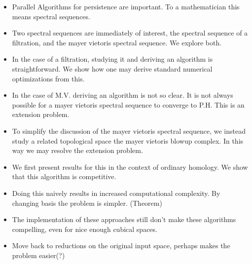 \begin{itemize}
\item Parallel Algorithms for persistence are important. To a mathematician this means spectral sequences.
\item Two spectral sequences are immediately of interest, the spectral sequence of a filtration, and the mayer vietoris spectral sequence.  We explore both.
\item In the case of a filtration, studying it and deriving an algorithm is straightforward. We show how one may derive standard numerical optimizations from this.
\item In the case of M.V. deriving an algorithm is not so clear. It is not always possible for a mayer vietoris spectral sequence to converge to P.H. This is an extension problem.
\item To simplify the discussion of the mayer vietoris spectral sequence, we instead study a related topological space the mayer vietoris blowup complex. In this way we may resolve the extension problem. 
\item We first present results for this in the context of ordinary homology. We show that this algorithm is competitive. 
\item Doing this naively results in increased computational complexity. By changing basis the problem is simpler. (Theorem)
\item The implementation of these approaches still don't make these algorithms compelling, even for nice enough cubical spaces.
\item Move back to reductions on the original input space, perhaps makes the problem easier(?)
\end{itemize}